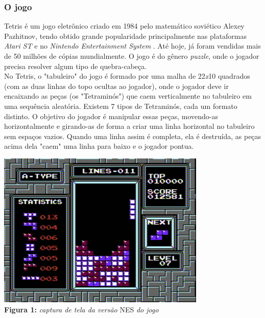\documentclass[conference]{IEEEtran}
\begin{document}
\subsubsection{O jogo}
Tetris é um jogo eletrônico criado em 1984 pelo matemático soviético Alexey Pazhitnov, tendo obtido grande popularidade principalmente nas plataformas \textit{Atari  ST} e no \textit{Nintendo Entertainment System} \cite{b1}. Até hoje, já foram vendidas mais de 50 milhões de cópias mundialmente. O jogo é do gênero \textit{puzzle}, onde o jogador precisa resolver algum tipo de quebra-cabeça. \\
No Tetris, o "tabuleiro" do jogo é formado por uma malha de 22\textit{x}10 quadrados (com as duas linhas do topo ocultas ao jogador), onde o jogador deve ir encaixando as peças (os "Tetraminós") que caem verticalmente no tabuleiro em uma sequência aleatória. Existem 7 tipos de Tetraminós, cada um formato distinto. O objetivo do jogador é manipular essas peças, movendo-as horizontalmente e girando-as de forma a criar uma linha horizontal no tabuleiro sem espaços vazios. Quando uma linha assim é completa, ela é destruída, as peças acima dela "caem" uma linha para baixo e o jogador pontua.
\begin{center}
\includegraphics[scale=0.5]{tetris_nes.png}\\

\textbf{Figura 1:} \textit{captura de tela da versão} NES \textit{do jogo}
\end{center}
\end{document}

